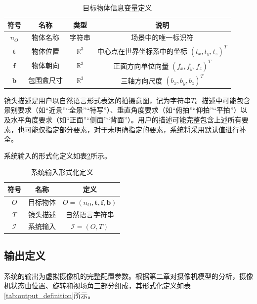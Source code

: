 \begin{table}[htbp]
\centering
\caption{目标物体信息变量定义}
\label{tab:target_definition}
\begin{tabular}{cccc}
\toprule
符号 & 名称 & 类型 & 说明 \\
\midrule
$n_O$ & 物体名称 & 字符串 & 场景中的唯一标识符 \\
$\mathbf{t}$ & 物体位置 & $\mathbb{R}^3$ & 中心点在世界坐标系中的坐标 $(t_x, t_y, t_z)^T$ \\
$\mathbf{f}$ & 物体朝向 & $\mathbb{R}^3$ & 正面方向单位向量 $(f_x, f_y, f_z)^T$ \\
$\mathbf{b}$ & 包围盒尺寸 & $\mathbb{R}^3$ & 三轴方向尺度 $(b_x, b_y, b_z)^T$ \\
\bottomrule
\end{tabular}
\end{table}

镜头描述是用户以自然语言形式表达的拍摄意图，记为字符串$T$。描述中可能包含景别要求（如“近景”“全景”“特写”）、垂直角度要求（如“俯拍”“仰拍”“平拍”）以及水平角度要求（如“正面”“侧面”“背面”）。用户的描述可能完整包含上述所有要素，也可能仅指定部分要素，对于未明确指定的要素，系统将采用默认值进行补全。

系统输入的形式化定义如表\ref{tab:input_definition}所示。

\begin{table}[htbp]
\centering
\caption{系统输入形式化定义}
\label{tab:input_definition}
\begin{tabular}{ccc}
\toprule
符号 & 名称 & 定义 \\
\midrule
$O$ & 目标物体 & $O = (n_O, \mathbf{t}, \mathbf{f}, \mathbf{b})$ \\
$T$ & 镜头描述 & 自然语言字符串 \\
$\mathcal{I}$ & 系统输入 & $\mathcal{I} = (O, T)$ \\
\bottomrule
\end{tabular}
\end{table}

\subsection{输出定义}

系统的输出为虚拟摄像机的完整配置参数。根据第二章对摄像机模型的分析，摄像机状态由位置、旋转和视场角三部分组成，其形式化定义如表\ref{tab:output_definition}所示。

